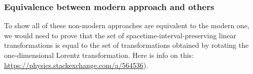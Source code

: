 \documentclass{article}
\begin{document}
\subsubsection*{Equivalence between modern approach and others}

To show all of these non-modern approaches are equivalent to the modern one, we would need to prove that the set of spacetime-interval-preserving linear transformations is equal to the set of transformations obtained by rotating the one-dimensional Lorentz transformation. Here is info on this: \url{https://physics.stackexchange.com/a/564536}).
\end{document}
